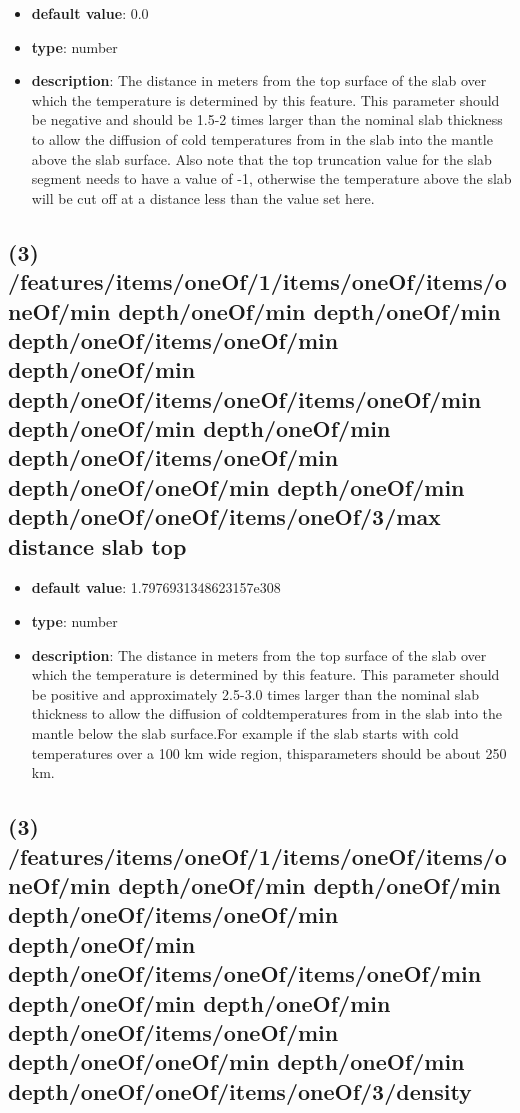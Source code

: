 \begin{itemize}[leftmargin=3em]\item {\bf default value}: 0.0
\item {\bf type}: number
\item {\bf description}: The distance in meters from the top surface of the slab over which the temperature is determined by this feature. This parameter should be negative and should be 1.5-2 times larger than the nominal slab thickness to allow the diffusion of cold temperatures from in the slab into the mantle above the slab surface. Also note that the top truncation value for the slab segment needs to have a value of -1, otherwise the temperature above the slab will be cut off at a distance less than the value set here.
\end{itemize}\subsection{(3) /features/items/oneOf/1/items/oneOf/items/oneOf/min depth/oneOf/min depth/oneOf/min depth/oneOf/items/oneOf/min depth/oneOf/min depth/oneOf/items/oneOf/items/oneOf/min depth/oneOf/min depth/oneOf/min depth/oneOf/items/oneOf/min depth/oneOf/oneOf/min depth/oneOf/min depth/oneOf/oneOf/items/oneOf/3/max distance slab top}
\begin{itemize}[leftmargin=3em]\item {\bf default value}: 1.7976931348623157e308
\item {\bf type}: number
\item {\bf description}: The distance in meters from the top surface of the slab over which the temperature is determined by this feature. This parameter should be positive and approximately 2.5-3.0 times larger than the nominal slab thickness to allow the diffusion of coldtemperatures from in the slab into the mantle below the slab surface.For example if the slab starts with cold temperatures over a 100 km wide region, thisparameters should be about 250 km.
\end{itemize}\subsection{(3) /features/items/oneOf/1/items/oneOf/items/oneOf/min depth/oneOf/min depth/oneOf/min depth/oneOf/items/oneOf/min depth/oneOf/min depth/oneOf/items/oneOf/items/oneOf/min depth/oneOf/min depth/oneOf/min depth/oneOf/items/oneOf/min depth/oneOf/oneOf/min depth/oneOf/min depth/oneOf/oneOf/items/oneOf/3/density}

